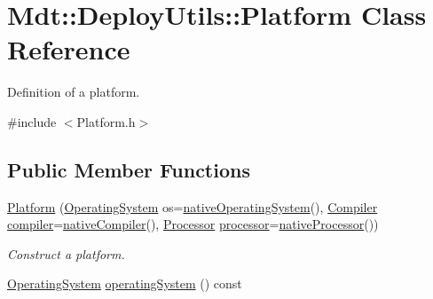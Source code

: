 \hypertarget{class_mdt_1_1_deploy_utils_1_1_platform}{}\section{Mdt\+:\+:Deploy\+Utils\+:\+:Platform Class Reference}
\label{class_mdt_1_1_deploy_utils_1_1_platform}


Definition of a platform.  




{\ttfamily \#include $<$Platform.\+h$>$}

\subsection*{Public Member Functions}
\begin{DoxyCompactItemize}
\item 
\hyperlink{class_mdt_1_1_deploy_utils_1_1_platform_a1d0bfc4226c34681de02fb71bdf21ab1}{Platform} (\hyperlink{namespace_mdt_1_1_deploy_utils_a998c3ae583084b7cac9e9a71b9e1ac32}{Operating\+System} os=\hyperlink{class_mdt_1_1_deploy_utils_1_1_platform_aa9c466ca43cea94e751b73f8270fe4bb}{native\+Operating\+System}(), \hyperlink{namespace_mdt_1_1_deploy_utils_aabc55fa0829b602f94e42f55f66173e3}{Compiler} \hyperlink{class_mdt_1_1_deploy_utils_1_1_platform_a453beb4e9409bc5c1473ffae3f211dc0}{compiler}=\hyperlink{class_mdt_1_1_deploy_utils_1_1_platform_aeca6535d32ac63294f3f8dfcb9b996a7}{native\+Compiler}(), \hyperlink{namespace_mdt_1_1_deploy_utils_aa3c03f55a06150c118902133f9a74b6f}{Processor} \hyperlink{class_mdt_1_1_deploy_utils_1_1_platform_a5f94968dbefcbe843b503fae9afb9ce6}{processor}=\hyperlink{class_mdt_1_1_deploy_utils_1_1_platform_afcf216e9f71ad3df91588dd1e96e05ee}{native\+Processor}())\hypertarget{class_mdt_1_1_deploy_utils_1_1_platform_a1d0bfc4226c34681de02fb71bdf21ab1}{}\label{class_mdt_1_1_deploy_utils_1_1_platform_a1d0bfc4226c34681de02fb71bdf21ab1}

\begin{DoxyCompactList}\small\item\em Construct a platform. \end{DoxyCompactList}\item 
\hyperlink{namespace_mdt_1_1_deploy_utils_a998c3ae583084b7cac9e9a71b9e1ac32}{Operating\+System} \hyperlink{class_mdt_1_1_deploy_utils_1_1_platform_a564312f1a3df51c9028ba35e05fb4c45}{operating\+System} () const \hypertarget{class_mdt_1_1_deploy_utils_1_1_platform_a564312f1a3df51c9028ba35e05fb4c45}{}\label{class_mdt_1_1_deploy_utils_1_1_platform_a564312f1a3df51c9028ba35e05fb4c45}


\end{DoxyCompactItemize}
